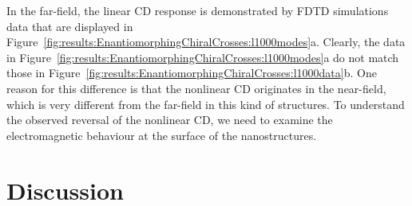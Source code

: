 In the far-field, the linear CD response is demonstrated by FDTD simulations data that are displayed in Figure~\ref{fig:results:EnantiomorphingChiralCrosses:l1000modes}a. Clearly, the data in Figure~\ref{fig:results:EnantiomorphingChiralCrosses:l1000modes}a do not match those in Figure~\ref{fig:results:EnantiomorphingChiralCrosses:l1000data}b. One reason for this difference is that the nonlinear CD originates in the near-field, which is very different from the far-field in this kind of structures. To understand the observed reversal of the nonlinear CD, we need to examine the electromagnetic behaviour at the surface of the nanostructures. 

\section{Discussion}\label{sec:results:EnantiomorphingChiralCrosses:discussion}

